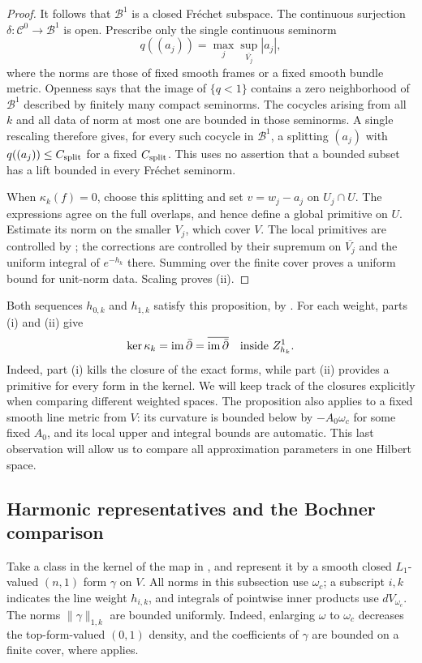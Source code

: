 \begin{proof}
It follows that $\mathcal B^1$ is a closed Fr\'echet subspace.  The
continuous surjection
$\delta:\mathcal C^0\to\mathcal B^1$ is open.  Prescribe only the
single continuous seminorm
\[
 q((a_j))=\max_j\sup_{\overline{V_j}}|a_j|,
\]
where the norms are those of fixed smooth frames or a fixed smooth
bundle metric.  Openness says that the image of $\{q<1\}$ contains a
zero neighborhood of $\mathcal B^1$ described by finitely many compact
seminorms.  The cocycles arising from all $k$ and all data of norm at
most one are bounded in those seminorms.  A single rescaling therefore
gives, for every such cocycle in $\mathcal B^1$, a splitting
$(a_j)$ with $q((a_j))\le C_{\rm split}$ for a fixed
$C_{\rm split}$.  This uses no
assertion that a bounded subset has a lift bounded in every
Fr\'echet seminorm.

When $\kappa_k(f)=0$, choose this splitting and set
$v=w_j-a_j$ on $U_j\cap U$.  The expressions agree on the full
overlaps, and hence define a global primitive on $U$.  Estimate its
norm on the smaller $V_j$, which cover $V$.  The local primitives
are controlled by ; the corrections
are controlled by their supremum on $\overline{V_j}$ and the uniform
integral of $e^{-h_k}$ there.  Summing over the finite cover proves a
uniform bound for unit-norm data.  Scaling proves (ii).
\end{proof}

Both sequences $h_{0,k}$ and $h_{1,k}$ satisfy this proposition, by
.
For each weight, parts (i) and (ii) give
\[
 \ker\kappa_k=\operatorname{im}\bar\partial=\overline{\operatorname{im}\bar\partial}
 \quad\text{inside }Z^1_{h_k}.
\]
Indeed, part (i) kills the closure of the exact forms, while part (ii)
provides a primitive for every form in the kernel. We will keep track
of the closures explicitly when comparing different weighted spaces.
The proposition also applies to a fixed smooth line metric from $V$: its curvature
is bounded below by $-A_0\omega_c$ for some fixed $A_0$, and its
local upper and integral bounds are automatic.  This last observation
will allow us to compare all approximation parameters in one Hilbert
space.

\subsection{Harmonic representatives and the Bochner comparison}

Take a class in the kernel of the map in
, and represent it by a smooth closed
$L_1$-valued $(n,1)$ form $\gamma$ on $V$.  All norms in this
subsection use $\omega_c$; a subscript $i,k$ indicates the line
weight $h_{i,k}$, and integrals of pointwise inner products use
$dV_{\omega_c}$.  The norms $\|\gamma\|_{1,k}$ are bounded
uniformly.  Indeed, enlarging $\omega$ to $\omega_c$ decreases the
top-form-valued $(0,1)$ density, and the coefficients of $\gamma$ are
bounded on a finite cover, where 
applies.

